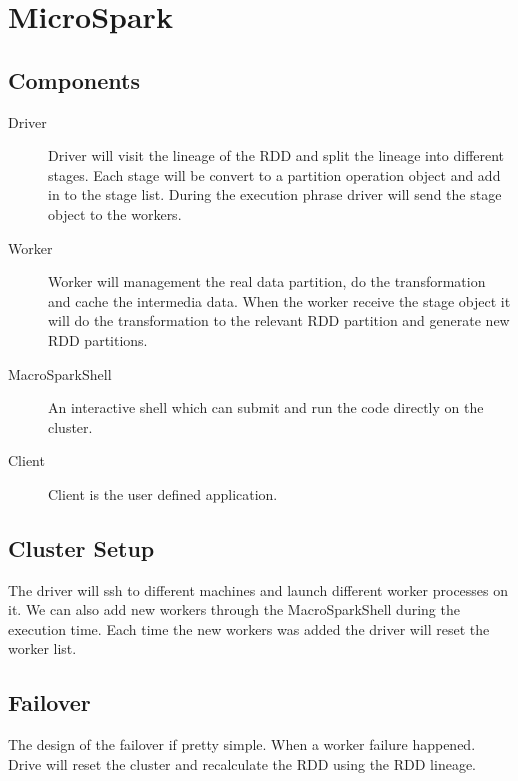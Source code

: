 
\section{MicroSpark} %
\label{sec:microspark}

\subsection{Components} %
\label{sub:components}

\begin{description}
    \item[Driver]
    Driver will visit the lineage of the RDD and split the lineage into different stages. Each stage will be convert to a partition operation object and add in to the stage list. During the execution phrase driver will send the stage object to the workers.
    \item[Worker]
    Worker will management the real data partition, do the transformation and cache the intermedia data. When the worker receive the stage object it will do the transformation to the relevant RDD partition and generate new RDD partitions.
    \item[MacroSparkShell]
    An interactive shell which can submit and run the code directly on the cluster.
    \item[Client]
    Client is the user defined application.
\end{description}


\subsection{Cluster Setup} %
\label{sub:cluster_setup}
The driver will ssh to different machines and launch different worker processes on it. We can also add new workers through the MacroSparkShell during the execution time. Each time the new workers was added the driver will reset the worker list.

\subsection{Failover} %
\label{sub:failover}
The design of the failover if pretty simple. When a worker failure happened. Drive will reset the cluster and recalculate the RDD using the RDD lineage.

